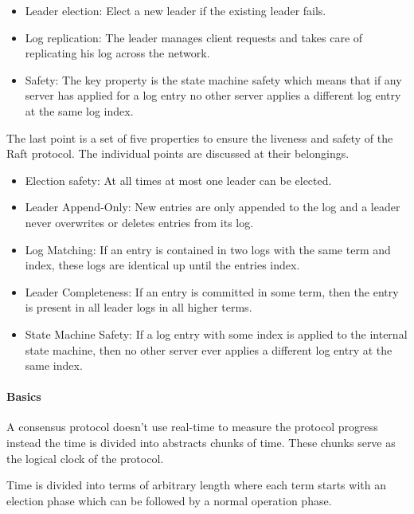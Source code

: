 \begin{itemize}
\item Leader election: Elect a new leader if the existing leader fails.
\item Log replication: The leader manages client requests and takes care
  of replicating his log across the network.
\item Safety:  The key property is the state machine safety which means that
  if any server has applied for a log entry no other server applies a
  different log entry at the same log index.
\end{itemize}

The last point is a set of five properties to ensure the liveness and
safety of the Raft protocol. The individual points are discussed at
their belongings.~\cite{ongaro2014search}

\begin{itemize}
\item Election safety: At all times at most one leader can be elected.
\item Leader Append-Only: New entries are only appended to the log and
  a leader never overwrites or deletes entries from its log.
\item Log Matching: If an entry is contained in two logs with the same
  term and index, these logs are identical up until the entries index.
\item Leader Completeness: If an entry is committed in some term, then the
  entry is present in all leader logs in all higher terms.
\item State Machine Safety: If a log entry with some index is applied to
  the internal state machine, then no other server ever applies a
  different log entry at the same index.
\end{itemize}

\paragraph{Basics}
A consensus protocol doesn't use real-time to measure the protocol progress
instead the time is divided into abstracts chunks of time. These chunks
serve as the logical clock of the protocol.~\cite{ongaro2014search}

\begin{defi}
  Time is divided into terms of arbitrary length where each term
  starts with an election phase which can be followed by a normal
  operation phase.
\end{defi}


